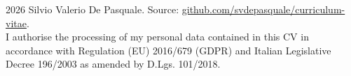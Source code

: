 \documentclass[10pt,a4paper]{article}
\begin{document}
\vfill
{\scriptsize\color{muted}
\textcopyright{} 2026 Silvio Valerio De Pasquale. Source: \href{https://github.com/svdepasquale/curriculum-vitae}{github.com/svdepasquale/curriculum-vitae}.\\
I authorise the processing of my personal data contained in this CV in accordance with Regulation (EU) 2016/679 (GDPR) and Italian Legislative Decree 196/2003 as amended by D.Lgs. 101/2018.
}
\end{document}
